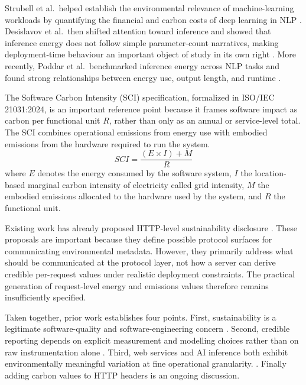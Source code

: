 Strubell et al.\ helped establish the environmental relevance of machine-learning workloads by quantifying the financial and carbon costs of deep learning in NLP \cite{strubell-etal-2019-energy}. Desislavov et al.\ then shifted attention toward inference and showed that inference energy does not follow simple parameter-count narratives, making deployment-time behaviour an important object of study in its own right \cite{desislavov2023trends}. More recently, Poddar et al.\ benchmarked inference energy across NLP tasks and found strong relationships between energy use, output length, and runtime \cite{poddar2025towards}. 

The Software Carbon Intensity (SCI) specification\cite{gsf-sci}, formalized in ISO/IEC 21031:2024, is an important reference point because it frames software impact as carbon per functional unit \(R\), rather than only as an annual or service-level total. The SCI combines operational emissions from energy use with embodied emissions from the hardware required to run the system.
\[
SCI = \frac{(E \times I) + M}{R}
\]
where \(E\) denotes the energy consumed by the software system, \(I\) the location-based marginal carbon intensity of electricity called grid intensity, \(M\) the embodied emissions allocated to the hardware used by the system, and \(R\) the functional unit.

Existing work has already proposed HTTP-level sustainability disclosure \cite{martin-http-carbon-emissions-scope-2-00,besleaga-green-sustainability-header-00}. These proposals are important because they define possible protocol surfaces for communicating environmental metadata. However, they primarily address what should be communicated at the protocol layer, not how a server can derive credible per-request values under realistic deployment constraints. The practical generation of request-level energy and emissions values therefore remains insufficiently specified.

Taken together, prior work establishes four points. First, sustainability is a legitimate software-quality and software-engineering concern \cite{kern2015impacts,lago2015framing,verdecchia2021green}. Second, credible reporting depends on explicit measurement and modelling choices rather than on raw instrumentation alone \cite{guldner2024gsmm}. Third, web services and AI inference both exhibit environmentally meaningful variation at fine operational granularity. \cite{souza2023casper,sala2024greenwebmeter,poddar2025towards,desislavov2023trends}. Finally adding carbon values to HTTP headers is an ongoing discussion.



